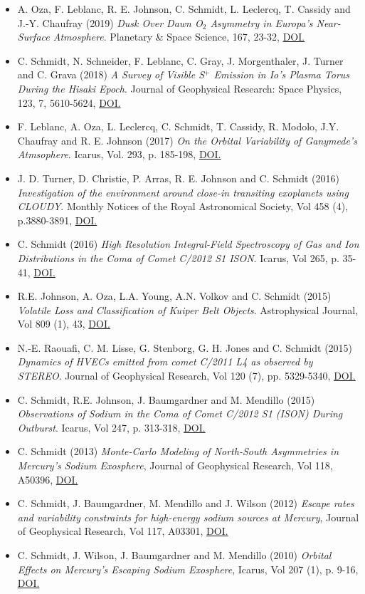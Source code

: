 \documentclass[12pt]{report}
\begin{document}
\begin{itemize}
  \item A. Oza, F. Leblanc, R. E. Johnson, C. Schmidt, L. Leclercq, T. Cassidy and J.-Y. Chaufray (2019) \textit{Dusk Over Dawn O$_2$ Asymmetry in Europa's Near-Surface Atmosphere}. Planetary \& Space Science, 167, 23-32, \href{https://doi.org/10.1016/j.pss.2019.01.006}{DOI.}
  \item C. Schmidt, N. Schneider, F. Leblanc, C. Gray, J. Morgenthaler, J. Turner and C. Grava (2018) \textit{A Survey of Visible S$^+$ Emission in Io's Plasma Torus During the Hisaki Epoch}. Journal of Geophysical Research: Space Physics, 123, 7, 5610-5624, \href{https://doi.org/10.1029/2018JA025296}{DOI.}
  \item F. Leblanc, A. Oza, L. Leclercq, C. Schmidt, T. Cassidy, R. Modolo, J.Y. Chaufray and R. E. Johnson (2017) \textit{On the Orbital Variability of Ganymede's Atmsophere}. Icarus, Vol. 293, p. 185-198, \href{doi.org/10.1016/j.icarus.2017.04.025}{DOI.}
  \item J. D. Turner, D. Christie, P. Arras, R. E. Johnson and C. Schmidt (2016) \textit{Investigation of the environment around close-in transiting exoplanets using CLOUDY}. Monthly Notices of the Royal Astronomical Society, Vol 458 (4), p.3880-3891, \href{https://doi.org/10.1093/mnras/stw556}{DOI.}
  \item C. Schmidt (2016) \textit{High Resolution Integral-Field Spectroscopy of Gas and Ion Distributions in the Coma of Comet C/2012 S1 ISON}. Icarus, Vol 265, p. 35-41, \href{https://doi.org/10.1016/j.icarus.2015.10.009}{DOI.}
  \item R.E. Johnson, A. Oza, L.A. Young, A.N. Volkov and C. Schmidt (2015) \textit{Volatile Loss and Classification of Kuiper Belt Objects}. Astrophysical Journal, Vol 809 (1), 43, \href{https://doi.org/10.1088/0004-637X/809/1/43}{DOI.}
  \item N.-E. Raouafi, C. M. Lisse, G. Stenborg, G. H. Jones and C. Schmidt (2015) \textit{Dynamics of HVECs emitted from comet C/2011 L4 as observed by STEREO}. Journal of Geophysical Research, Vol 120 (7), pp. 5329-5340, \href{https://doi.org/10.1002/2014JA020926}{DOI.}
  \item C. Schmidt, R.E. Johnson, J. Baumgardner and M. Mendillo (2015) \textit{Observations of Sodium in the Coma of Comet C/2012 S1 (ISON) During Outburst}. Icarus, Vol 247, p. 313-318, \href{https://doi.org/10.1016/j.icarus.2014.10.022}{DOI.}
  \item C. Schmidt (2013) \textit{Monte-Carlo Modeling of North-South Asymmetries in Mercury's Sodium Exosphere}, Journal of Geophysical Research, Vol 118, A50396, \href{https://doi.org/10.1002/jgra.50396}{DOI.}
  \item C. Schmidt, J. Baumgardner, M. Mendillo and J. Wilson (2012) \textit{Escape rates and variability constraints for high-energy sodium sources at Mercury}, Journal of Geophysical Research, Vol 117, A03301, \href{https://doi.org/10.1029/2011JA017217}{DOI.}
  \item C. Schmidt, J. Wilson, J. Baumgardner and M. Mendillo (2010) \textit{Orbital Effects on Mercury's Escaping Sodium Exosphere}, Icarus, Vol 207 (1), p. 9-16, \href{https://doi.org/10.1016/j.icarus.2009.10.017}{DOI.}
 \end{itemize}
\end{document}
